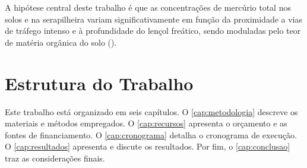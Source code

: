 A hipótese central deste trabalho é que as concentrações de mercúrio
total nos solos e na serapilheira variam significativamente em função
da proximidade a vias de tráfego intenso e à profundidade do lençol
freático, sendo moduladas pelo teor de matéria orgânica do solo
().

\section{Estrutura do Trabalho}

Este trabalho está organizado em seis capítulos. O
\autoref{cap:metodologia} descreve os materiais e métodos empregados.
O \autoref{cap:recursos} apresenta o orçamento e as fontes de
financiamento. O \autoref{cap:cronograma} detalha o cronograma de
execução. O \autoref{cap:resultados} apresenta e discute os resultados.
Por fim, o \autoref{cap:conclusao} traz as considerações finais.
